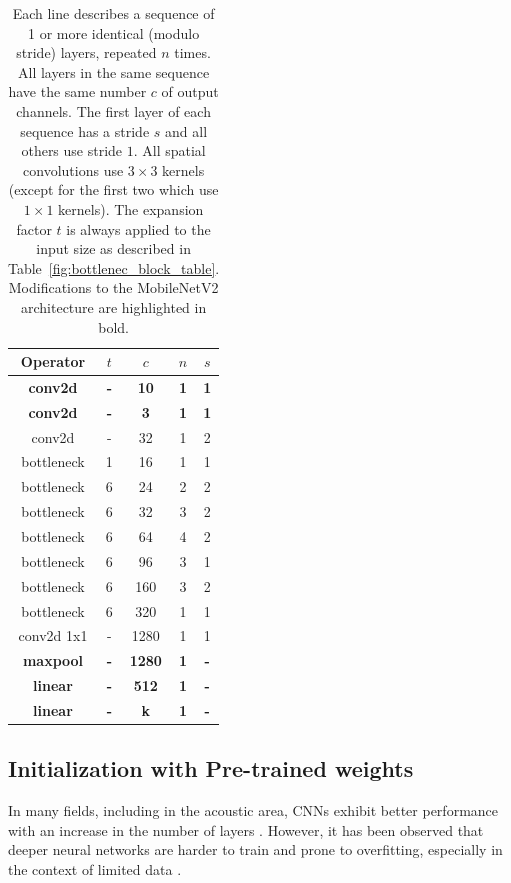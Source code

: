 \documentclass{article}
\begin{document}
\begin{sloppy}
\begin{table}[]
\centering
\vspace{0pt}
\begin{tabular}{c|c|c|c|c}
Operator & $t$ & $c$ & $n$ & $s$ \\ \hline
\textbf{conv2d} & \textbf{-} & \textbf{10} & \textbf{1} & \textbf{1} \\
\textbf{conv2d} & \textbf{-} & \textbf{3} & \textbf{1} & \textbf{1} \\
conv2d & - & 32 & 1 & 2 \\
bottleneck & 1 & 16 & 1 & 1 \\
bottleneck & 6 & 24 & 2 & 2 \\
bottleneck & 6 & 32 & 3 & 2 \\
bottleneck & 6 & 64 & 4 & 2 \\
bottleneck & 6 & 96 & 3 & 1 \\
bottleneck & 6 & 160 & 3 & 2 \\
bottleneck & 6 & 320 & 1 & 1 \\
conv2d 1x1 & - & 1280 & 1 & 1 \\
\textbf{maxpool} & \textbf{-} & \textbf{1280} & \textbf{1} & \textbf{-} \\
\textbf{linear} & \textbf{-} & \textbf{512} & \textbf{1} & \textbf{-} \\
\textbf{linear} & \textbf{-} & \textbf{k} & \textbf{1} & \textbf{-} \\ \hline
\end{tabular}
\caption {Each line describes a sequence of 1 or more identical (modulo stride)  layers, repeated $n$ times. All layers in the same sequence have the same number $c$ of output channels. The first layer of each sequence has a stride $s$ and all others use stride $1$. All spatial convolutions use $3\times 3$ kernels (except for the first two which use $1\times 1$ kernels). The expansion factor $t$ is always applied to the input size as described in Table~\ref{fig:bottlenec_block_table}. Modifications to the MobileNetV2 architecture are highlighted in bold.}
\label{mobilenet:arch}
\end{table}

\subsection{Initialization with Pre-trained weights}
\label{ssec:imagenet}
In many fields, including in the acoustic area, CNNs exhibit better performance with an increase in the number of layers \cite{eigen2013understanding, seide2011conversational}. However, it has been observed that deeper neural networks are harder to train and prone to overfitting, especially in the context of limited data \cite{szegedy2015going}.


\end{sloppy}
\end{document}
